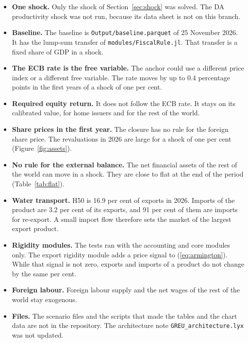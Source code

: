 \documentclass[11pt,a4paper]{article}
\newcommand{\code}[1]{\texttt{#1}}
\begin{document}
\begin{itemize}
\item \textbf{One shock.} Only the shock of Section~\ref{sec:shock} was solved. The DA productivity shock was not run, because its data sheet is not on this branch.
\item \textbf{Baseline.} The baseline is \code{Output/baseline.parquet} of 25 November 2026. It has the lump-sum transfer of \code{modules/FiscalRule.jl}. That transfer is a fixed share of GDP in a shock.
\item \textbf{The ECB rate is the free variable.} The anchor could use a different price index or a different free variable. The rate moves by up to 0.4 percentage points in the first years of a shock of one per cent.
\item \textbf{Required equity return.} It does not follow the ECB rate. It stays on its calibrated value, for home issuers and for the rest of the world.
\item \textbf{Share prices in the first year.} The closure has no rule for the foreign share price. The revaluations in 2026 are large for a shock of one per cent (Figure~\ref{fig:assets}).
\item \textbf{No rule for the external balance.} The net financial assets of the rest of the world can move in a shock. They are close to flat at the end of the period (Table~\ref{tab:flat}).
\item \textbf{Water transport.} H50 is 16.9 per cent of exports in 2026. Imports of the product are 3.2 per cent of its exports, and 91 per cent of them are imports for re-export. A small import flow therefore sets the market of the largest export product.
\item \textbf{Rigidity modules.} The tests ran with the accounting and core modules only. The export rigidity module adds a price signal to (\ref{eq:armington}). While that signal is not zero, exports and imports of a product do not change by the same per cent.
\item \textbf{Foreign labour.} Foreign labour supply and the net wages of the rest of the world stay exogenous.
\item \textbf{Files.} The scenario files and the scripts that made the tables and the chart data are not in the repository. The architecture note \code{GREU\_architecture.lyx} was not updated.
\end{itemize}
\end{document}
